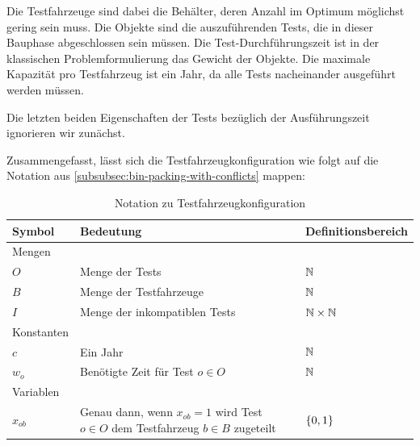 Die Testfahrzeuge sind dabei die Behälter, deren Anzahl im Optimum möglichst gering sein muss.
Die Objekte sind die auszuführenden Tests, die in dieser Bauphase abgeschlossen sein müssen.
Die Test-Durchführungszeit ist in der klassischen Problemformulierung das Gewicht der Objekte.
Die maximale Kapazität pro Testfahrzeug ist ein Jahr, da alle Tests nacheinander ausgeführt werden müssen.

Die letzten beiden Eigenschaften der Tests bezüglich der Ausführungszeit ignorieren wir zunächst.

Zusammengefasst, lässt sich die Testfahrzeugkonfiguration wie folgt auf die Notation aus
\cref{subsubsec:bin-packing-with-conflicts} mappen:
\begin{table}[H]
    \begin{tabularx}{\textwidth}{  l | X | l }
    Symbol & Bedeutung & Definitionsbereich \\\hline\hline
    Mengen & & \\\hline\hline
    $O$ & Menge der Tests & $\mathbb{N}$\\\hline
    $B$ & Menge der Testfahrzeuge & $\mathbb{N}$\\\hline
    $I$ & Menge der inkompatiblen Tests & $\mathbb{N}\times\mathbb{N}$\\\hline\hline
    Konstanten &  &  \\\hline\hline
    $c$ & Ein Jahr & $\mathbb{N}$\\\hline
    $w_o$ & Benötigte Zeit für Test $o\in O$ & $\mathbb{N}$\\\hline\hline
    Variablen &  &  \\\hline\hline
    $x_{ob}$ & Genau dann, wenn $x_{ob}=1$ wird Test $o\in O$ dem Testfahrzeug $b\in B$ zugeteilt & $\{0,1\}$\\\hline
    \end{tabularx}
    \caption{Notation zu Testfahrzeugkonfiguration}\label{tab:notation_test_vehicle}
\end{table}
